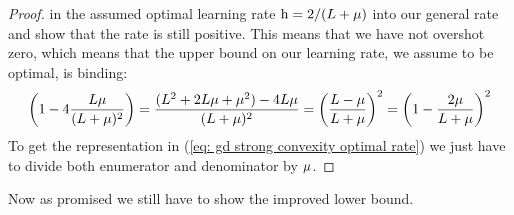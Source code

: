 \begin{proof}
	in the assumed optimal learning rate \(\text{h}=2/(L+\mu)\) into
	our general rate and show that the rate is still positive. This means that
	we have not overshot zero, which means that the upper bound on our learning
	rate, we assume to be optimal, is binding:
	\begin{align*}
		\left(1- 4 \frac{L\mu}{(L+\mu)^2}\right)
		= \frac{(L^2 + 2L\mu + \mu^2) - 4 L\mu}{(L+\mu)^2}
		= \left(\frac{L-\mu}{L+\mu}\right)^2
		= \left(1-\frac{2\mu}{L+\mu}\right)^2
	\end{align*}
	To get the representation in (\ref{eq: gd strong convexity optimal rate}) we
	just have to divide both enumerator and denominator by \(\mu\).
\end{proof}

Now as promised we still have to show the improved lower bound.

